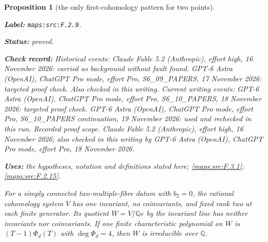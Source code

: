 \documentclass[11pt,a4paper]{article}
\newtheorem{proposition}[proposition]{Proposition}
\theoremstyle{definition}
\newcommand{\StatementRecord}[4]{\par\smallskip\begingroup\upshape\raggedright\noindent\textbf{Label:} \nolinkurl{#1}.\par\noindent\textbf{Status:} #2.\par\noindent\textbf{Check record:} #3.\par\noindent\textbf{Uses:} #4.\par\endgroup\smallskip}
\begin{document}
\begin{proposition}[the only first-cohomology pattern for two points]\label{maps:src:F.2.9}
\StatementRecord{maps:src:F.2.9}{proved}{Historical events: Claude Fable 5.2 (Anthropic), effort high, 16 November 2026: carried as background without fault found. GPT-6 Astra (OpenAI), ChatGPT Pro mode, effort Pro, S6\_09\_PAPERS, 17 November 2026: targeted proof check. Also checked in this writing. Current writing events: GPT-6 Astra (OpenAI), ChatGPT Pro mode, effort Pro, S6\_10\_PAPERS, 18 November 2026: targeted proof check. GPT-6 Astra (OpenAI), ChatGPT Pro mode, effort Pro, S6\_10\_PAPERS continuation, 19 November 2026: used and rechecked in this run. \emph{Recorded proof scope.} Claude Fable 5.2 (Anthropic), effort high, 16 November 2026; also checked in this writing by GPT-6 Astra (OpenAI), ChatGPT Pro mode, effort Pro, 18 November 2026}{the hypotheses, notation and definitions stated here; \cref{maps:src:F.3.1}; \cref{maps:src:F.2.15}}


For a simply connected two-multiple-fibre datum with $b_2=0$,
the rational
cohomology system $V$ has one invariant, no coinvariants,
and fixed rank two at each finite generator.  Its quotient
$W=V/\mathbb Qe$ by the invariant line has neither invariants
nor coinvariants.  If one finite characteristic polynomial
on $W$ is $(T-1)\Phi_d(T)$ with $\deg\Phi_d=4$, then $W$
is irreducible over $\mathbb Q$.

\end{proposition}
\end{document}

